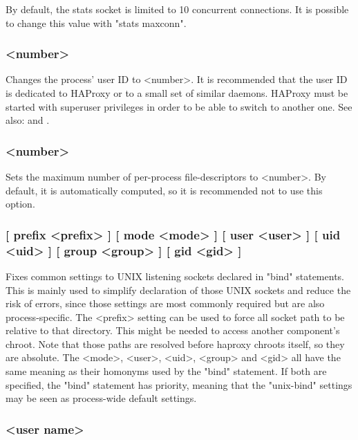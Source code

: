 By default, the stats socket is limited to 10 concurrent connections. It is
possible to change this value with "stats maxconn".

\subsubsection[uid]{ <number>}

Changes the process' user ID to <number>. It is recommended that the user ID
is dedicated to HAProxy or to a small set of similar daemons. HAProxy must
be started with superuser privileges in order to be able to switch to another
one. See also:  and .

\subsubsection[ulimit-n]{ <number>}

Sets the maximum number of per-process file-descriptors to <number>. By
default, it is automatically computed, so it is recommended not to use this
option.

\subsubsection[unix-bind]{ [ prefix <prefix> ] [ mode <mode> ] 
[ user <user> ] [ uid <uid> ] [ group <group> ] [ gid <gid> ]}

Fixes common settings to UNIX listening sockets declared in "bind" statements.
This is mainly used to simplify declaration of those UNIX sockets and reduce
the risk of errors, since those settings are most commonly required but are
also process-specific. The <prefix> setting can be used to force all socket
path to be relative to that directory. This might be needed to access another
component's chroot. Note that those paths are resolved before haproxy chroots
itself, so they are absolute. The <mode>, <user>, <uid>, <group> and <gid>
all have the same meaning as their homonyms used by the "bind" statement. If
both are specified, the "bind" statement has priority, meaning that the
"unix-bind" settings may be seen as process-wide default settings.

\subsubsection[user]{ <user name>}

